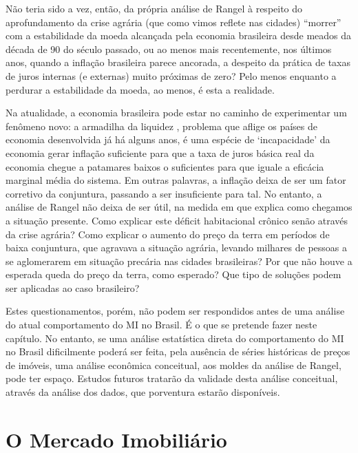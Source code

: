 \documentclass[
	12pt,				%
	oneside,			%
	a4paper,			%
	chapter=TITLE,		%
	section=TITLE,		%
	english,			%
	brazil				%
	]{abntex2}
\begin{document}
Não teria sido a vez, então, da própria análise de Rangel à respeito do
aprofundamento da crise agrária (que como vimos reflete nas cidades) ``morrer''
com a estabilidade da moeda alcançada pela economia brasileira desde meados da
década de 90 do século passado, ou ao menos mais recentemente, nos últimos anos,
quando a inflação brasileira parece ancorada, a despeito da prática de taxas de
juros internas (e externas) muito próximas de zero? Pelo menos enquanto a
perdurar a estabilidade da moeda, ao menos, é esta a realidade.

Na atualidade, a economia brasileira pode estar no caminho de experimentar um
fenômeno novo: a armadilha da liquidez \autocite[ver][]{krugman-emergentes}, problema que
aflige os países de economia desenvolvida já há alguns anos, é uma espécie de
`incapacidade' da economia gerar inflação suficiente para que a taxa de juros
básica real da economia chegue a patamares baixos o suficientes para que iguale
a eficácia marginal média do sistema. Em outras palavras, a inflação deixa de
ser um fator corretivo da conjuntura, passando a ser insuficiente para tal. No
entanto, a análise de Rangel não deixa de ser útil, na medida em que explica
como chegamos a situação presente. Como explicar este déficit habitacional
crônico senão através da crise agrária? Como explicar o aumento do preço da
terra em períodos de baixa conjuntura, que agravava a situação agrária, levando
milhares de pessoas a se aglomerarem em situação precária nas cidades
brasileiras? Por que não houve a esperada queda do preço da terra, como
esperado? Que tipo de soluções podem ser aplicadas ao caso brasileiro?

Estes questionamentos, porém, não podem ser respondidos antes de uma análise do
atual comportamento do \gls{MI} no Brasil. É o que se pretende fazer neste
capítulo. No entanto, se uma análise estatística direta do comportamento do
\gls{MI} no Brasil dificilmente poderá ser feita, pela ausência de séries
históricas de preços de imóveis, uma análise econômica conceitual, aos moldes da
análise de Rangel, pode ter espaço. Estudos futuros tratarão da validade desta
análise conceitual, através da análise dos dados, que porventura estarão
disponíveis.

\hypertarget{o-mercado-imobiliuxe1rio}{%
\section{O Mercado Imobiliário}\label{o-mercado-imobiliuxe1rio}}
\end{document}
